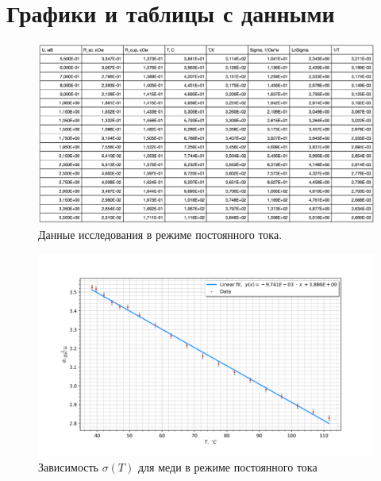 \documentclass[a4paper]{article}
\begin{document}
\section{Графики и таблицы с данными}

\begin{figure}[h]
    \begin{center}
        \includegraphics[scale = 0.55]{data2.png}
        \caption{Данные исследования в режиме постоянного тока.}
        \label{data2}
    \end{center}
\end{figure}

\begin{figure}[h]
    \begin{center}
        \includegraphics[scale = 0.75]{graph5.png}
        \caption{Зависимость $\sigma(T) $ для меди в режиме постоянного тока}
        \label{gr5}
    \end{center}
\end{figure}
\end{document}
